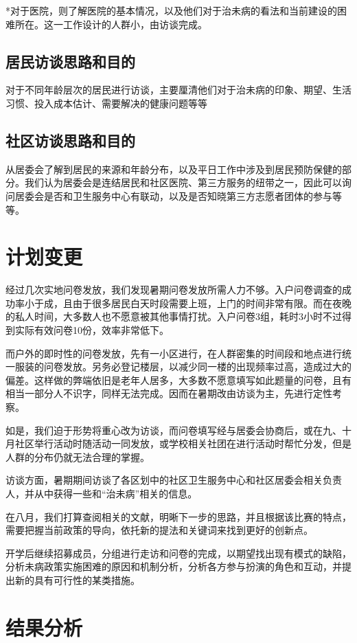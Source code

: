 \documentclass{article}
\begin{document}
        *对于医院，则了解医院的基本情况，以及他们对于治未病的看法和当前建设的困难所在。这一工作设计的人群小，由访谈完成。
            \subsection{居民访谈思路和目的}
            对于不同年龄层次的居民进行访谈，主要厘清他们对于治未病的印象、期望、生活习惯、投入成本估计、需要解决的健康问题等等
             \subsection{社区访谈思路和目的}
            从居委会了解到居民的来源和年龄分布，以及平日工作中涉及到居民预防保健的部分。我们认为居委会是连结居民和社区医院、第三方服务的纽带之一，因此可以询问居委会是否和卫生服务中心有联动，以及是否知晓第三方志愿者团体的参与等等。
    \section{计划变更}
        经过几次实地问卷发放，我们发现暑期问卷发放所需人力不够。入户问卷调查的成功率小于成，且由于很多居民白天时段需要上班，上门的时间非常有限。而在夜晚的私人时间，大多数人也不愿意被其他事情打扰。入户问卷3组，耗时3小时不过得到实际有效问卷10份，效率非常低下。
        
        而户外的即时性的问卷发放，先有一小区进行，在人群密集的时间段和地点进行统一服装的问卷发放。另务必登记楼层，以减少同一楼的出现频率过高，造成过大的偏差。这样做的弊端依旧是老年人居多，大多数不愿意填写如此题量的问卷，且有相当一部分人不识字，同样无法完成。因而在暑期改由访谈为主，先进行定性考察。
        
        如是，我们迫于形势将重心改为访谈，而问卷填写经与居委会协商后，或在九、十月社区举行活动时随活动一同发放，或学校相关社团在进行活动时帮忙分发，但是人群的分布仍就无法合理的掌握。
        
        访谈方面，暑期期间访谈了各区划中的社区卫生服务中心和社区居委会相关负责人，并从中获得一些和“治未病”相关的信息。
    
    在八月，我们打算查阅相关的文献，明晰下一步的思路，并且根据该比赛的特点，需要把握当前政策的导向，依托新的提法和关键词来找到更好的创新点。
    
    开学后继续招募成员，分组进行走访和问卷的完成，以期望找出现有模式的缺陷，分析未病政策实施困难的原因和机制分析，分析各方参与扮演的角色和互动，并提出新的具有可行性的某类措施。
    \section{结果分析}
\end{document}
